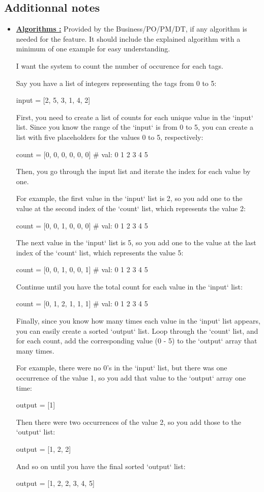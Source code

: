 \documentclass[a4paper,article,oneside]{memoir}
\begin{document}
        \subsection{Additionnal notes}
                \begin{itemize}
  			\item {\color{BrickRed}\textbf{\underline{Algorithms :}}} Provided by the \gls{Business}/\gls{PO}/\gls{PM}/\gls{DT}, if any algorithm is needed for the feature. It should include the explained algorithm with a minimum of one example for easy understanding.

\noindent{}

I want the system to count the number of occurence for each tags.

Say you have a list of integers representing the tags from 0 to 5:
 
input = [2, 5, 3, 1, 4, 2]

First, you need to create a list of counts for each unique value in
the `input` list. Since you know the range of the `input` is from 0 to
5, you can create a list with five placeholders for the values 0 to 5,
respectively:

count = [0, 0, 0, 0, 0, 0]
  \# val: 0  1  2  3  4  5

Then, you go through the input list and iterate the index for each value by one.

For example, the first value in the `input` list is 2, so you add one
to the value at the second index of the `count` list, which represents
the value 2:

count = [0, 0, 1, 0, 0, 0]
  \# val: 0  1  2  3  4  5
       
The next value in the `input` list is 5, so you add one to the value at
the last index of the `count` list, which represents the value 5:

count = [0, 0, 1, 0, 0, 1]
  \# val: 0  1  2  3  4  5

Continue until you have the total count for each value in the `input`
list:

count = [0, 1, 2, 1, 1, 1]
  \# val: 0  1  2  3  4  5

Finally, since you know how many times each value in the `input` list
appears, you can easily create a sorted `output` list. Loop through
the `count` list, and for each count, add the corresponding value
(0 - 5) to the `output` array that many times.

For example, there were no 0's in the `input` list, but there was one
occurrence of the value 1, so you add that value to the `output` array
one time:

output = [1]

Then there were two occurrences of the value 2, so you add those to the
`output` list:

output = [1, 2, 2]

And so on until you have the final sorted `output` list:

output = [1, 2, 2, 3, 4, 5]

		\end{itemize}
\end{document}
